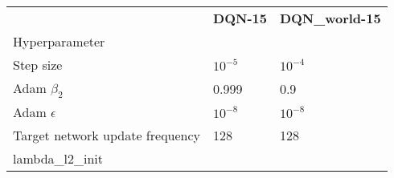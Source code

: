 \begin{tabular}{lll}
 & \bfseries DQN-15 & \bfseries DQN_world-15 \\
Hyperparameter &  &  \\
Step size & $10^{-5}$ & $10^{-4}$ \\
Adam $\beta_2$ & 0.999 & 0.9 \\
Adam $\epsilon$ & $10^{-8}$ & $10^{-8}$ \\
Target network update frequency & 128 & 128 \\
lambda_l2_init &  &  \\
\end{tabular}
